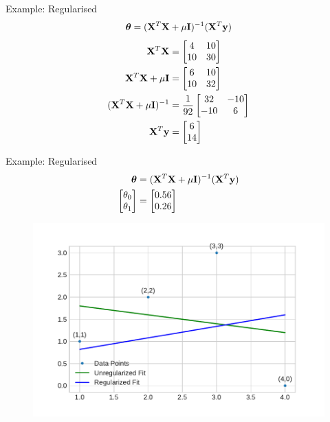 \documentclass{beamer}
\begin{document}
\begin{frame}{Example: Regularised}
\[
\boldsymbol{\theta} = (\mathbf{X}^{T}\mathbf{X}+\mu \mathbf{I})^{-1}(\mathbf{X}^{T}\mathbf{y})
\]
\pause
\begin{align*}
\mathbf{X}^{T}\mathbf{X} &= \begin{bmatrix}
4 &10\\10&30
\end{bmatrix} \\
\mathbf{X}^{T}\mathbf{X}+\mu \mathbf{I} &= \begin{bmatrix}
6 &10\\10&32
\end{bmatrix} \\
(\mathbf{X}^{T}\mathbf{X}+\mu \mathbf{I})^{-1} &= \frac{1}{92} \begin{bmatrix}
32 & -10\\
-10& 6
\end{bmatrix}\\
\mathbf{X}^{T}\mathbf{y} &= \begin{bmatrix}
6\\
14
\end{bmatrix}
\end{align*}
\end{frame}

\begin{frame}{Example: Regularised}
\vspace{0.4cm}
\begin{align*}
\begin{split}
\boldsymbol{\theta} &= (\mathbf{X}^{T}\mathbf{X}+\mu \mathbf{I})^{-1}(\mathbf{X}^{T}\mathbf{y}) \\
\begin{bmatrix}
\theta_{0}\\
\theta_{1}
\end{bmatrix} &= 
\begin{bmatrix}
0.56\\
0.26
\end{bmatrix} 
\end{split}
\end{align*}
\vspace{-0.8cm}
\begin{figure}
\includegraphics[width=0.8\linewidth]{../assets/ridge/figures/q_reg.pdf}
\end{figure}
\end{frame}
\end{document}
